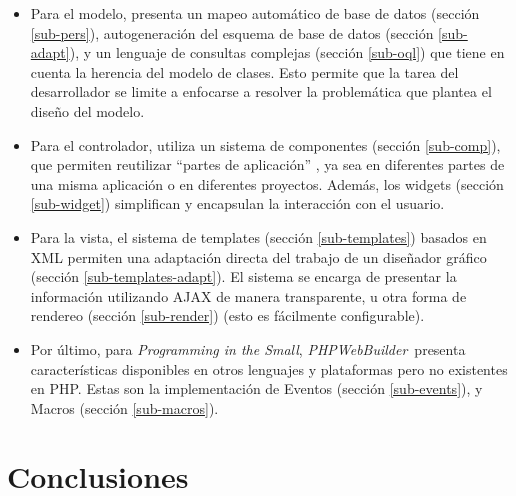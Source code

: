 \documentclass[a4paper,10pt]{article}
\newcommand{\PITS}{\emph{Programming in the Small}} %
\newcommand{\PWB}{\emph{PHPWebBuilder}}
\begin{document}
\begin{itemize}
\item Para el modelo, presenta un mapeo automático de base de datos (sección \ref{sub-pers}), autogeneración del esquema de base de datos (sección \ref{sub-adapt}), y un lenguaje de consultas complejas (sección \ref{sub-oql}) que tiene en cuenta la herencia del modelo de clases.  Esto permite que la tarea del desarrollador se limite a enfocarse a resolver la problemática que plantea el diseño del modelo.

\item Para el controlador, utiliza un sistema de componentes (sección \ref{sub-comp}), que permiten reutilizar ``partes de aplicación'' , ya sea en diferentes partes de una misma aplicación o en diferentes proyectos. Además, los widgets (sección \ref{sub-widget}) simplifican y encapsulan la interacción con el usuario.

\item Para la vista, el sistema de templates (sección \ref{sub-templates}) basados en XML permiten una adaptación directa del trabajo de un diseñador gráfico (sección \ref{sub-templates-adapt}). El sistema se encarga de presentar la información utilizando AJAX de manera transparente, u otra forma de rendereo (sección \ref{sub-render}) (esto es fácilmente configurable).

\item Por último, para \PITS, \PWB \ presenta características disponibles en otros lenguajes y plataformas pero no existentes en PHP. Estas son la implementación de Eventos (sección \ref{sub-events}),
y Macros (sección \ref{sub-macros}).

\end{itemize}


%




\section{Conclusiones}
\end{document}
